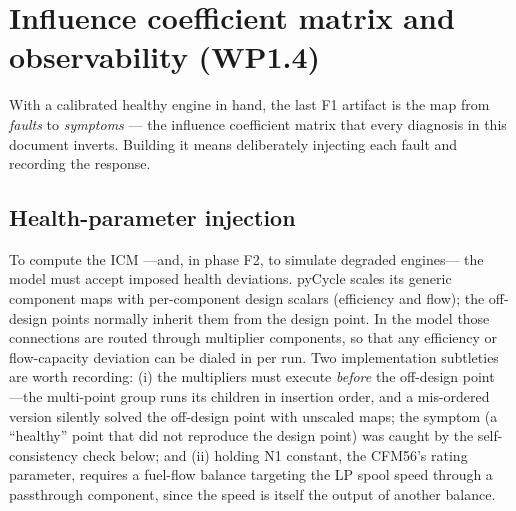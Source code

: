 \begin{table}[htbp]
  \centering\small
  \caption{Fitted correction exponents per channel and the leave-one-out error before (raw
  4-D coordinates) versus after (corrected space). Auto-generated.}
  \label{tab:corrected}
  
\end{table}

\begin{table}[htbp]
  \centering\small
  \caption{Leave-one-out interpolation error of the baseline deck, per channel.
  Auto-generated.}
  \label{tab:deck-loo}
  
\end{table}

\section{Influence coefficient matrix and observability (WP1.4)}
\label{sec:icm}

With a calibrated healthy engine in hand, the last F1 artifact is the map from
\emph{faults} to \emph{symptoms} --- the influence coefficient matrix that every diagnosis
in this document inverts. Building it means deliberately injecting each fault and recording
the response.

\subsection{Health-parameter injection}

To compute the ICM ---and, in phase F2, to simulate degraded engines--- the model must accept
imposed health deviations. pyCycle scales its generic component maps with per-component design
scalars (efficiency and flow); the off-design points normally inherit them from the design
point. In the  model those connections are routed through multiplier
components, so that any efficiency or flow-capacity deviation can be dialed in per run. Two
implementation subtleties are worth recording: (i) the multipliers must execute \emph{before}
the off-design point ---the multi-point group runs its children in insertion order, and a
mis-ordered version silently solved the off-design point with unscaled maps; the symptom (a
``healthy'' point that did not reproduce the design point) was caught by the self-consistency
check below; and (ii) holding N1 constant, the CFM56's rating parameter, requires a fuel-flow
balance targeting the LP spool speed through a passthrough component, since the speed is itself
the output of another balance.

